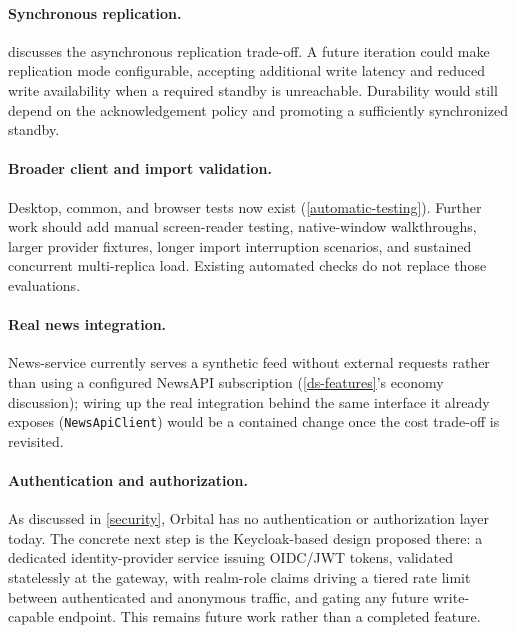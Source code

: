 \documentclass{scrartcl}
\begin{document}
\paragraph{Synchronous replication.}  discusses the asynchronous replication trade-off.
A future iteration could make replication mode configurable, accepting additional write latency
and reduced write availability when a required standby is unreachable. Durability would still
depend on the acknowledgement policy and promoting a sufficiently synchronized standby.

\paragraph{Broader client and import validation.} Desktop, common, and browser tests now exist
(\cref{automatic-testing}). Further work should add manual screen-reader testing, native-window
walkthroughs, larger provider fixtures, longer import interruption scenarios, and sustained
concurrent multi-replica load. Existing automated checks do not replace those evaluations.

\paragraph{Real news integration.} News-service currently serves a synthetic feed without
external requests rather than using a configured NewsAPI subscription (\cref{ds-features}'s economy discussion); wiring up the real
integration behind the same interface it already exposes (\texttt{NewsApiClient}) would be a
contained change once the cost trade-off is revisited.

\paragraph{Authentication and authorization.} As discussed in \cref{security}, Orbital has no
authentication or authorization layer today. The concrete next step is the Keycloak-based design
proposed there: a dedicated identity-provider service issuing OIDC/JWT tokens, validated
statelessly at the gateway, with realm-role claims driving a tiered rate limit between
authenticated and anonymous traffic, and gating any future write-capable endpoint. This remains
future work rather than a completed feature.



\end{document}
